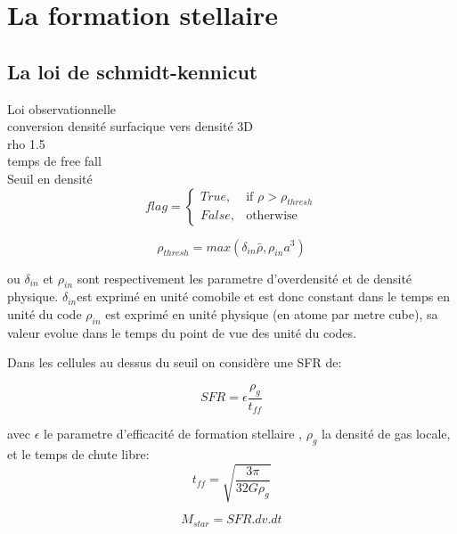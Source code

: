 \section{La formation stellaire}

\subsection{La loi de schmidt-kennicut}
Loi observationnelle \\
conversion densité surfacique vers densité 3D\\
rho 1.5\\
temps de free fall\\

Seuil en densité \\
\begin{equation}
	flag = 
  \begin{cases}
      True, & \text{if } \rho > \rho_{thresh}\\
      False,              & \text{otherwise}
  \end{cases}
\end{equation} 




\begin{equation}
	\rho_{thresh} = max\left(  \delta_{in} \bar{\rho}, \rho_{in} a^3 \right)
\end{equation} 

ou $\delta_{in}$ et $\rho_{in}$  sont respectivement les parametre d'overdensité et de densité physique.
$\delta_{in}$est exprimé en unité comobile et est donc constant dans le temps en unité du code
 $\rho_{in}$ est exprimé en unité physique (en atome par metre cube), sa valeur evolue dans le temps du point de vue des unité du codes.
 
Dans les cellules au dessus du seuil on considère une SFR de:

\begin{equation}
	SFR = \epsilon \frac{\rho_g}{t_{ff}}
    \label{eq_sfr}
\end{equation}


avec  $\epsilon$ le parametre d'efficacité de formation stellaire , $\rho_g$ la densité de gas locale, et le temps de chute libre:
\begin{equation}
t_{ff} = \sqrt{\frac{3\pi}{32G\rho_g}}
\end{equation}

\begin{equation}
	M_{star} = SFR . dv .dt 
\end{equation}

